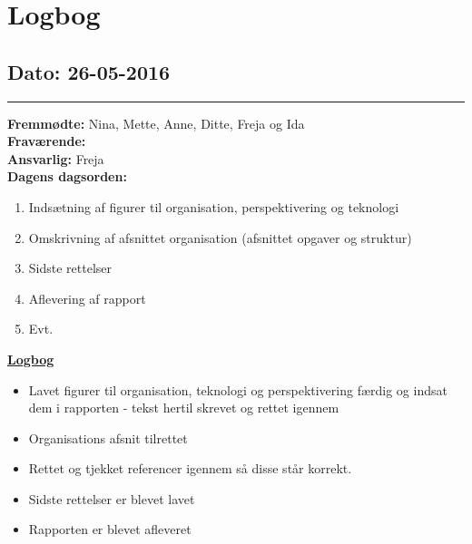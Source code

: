 \chapter{Logbog}
\section{Dato: 26-05-2016}
\hrule
\textbf{Fremmødte:} Nina, Mette, Anne, Ditte, Freja og Ida  \\
\textbf{Fraværende: } \\
\textbf{Ansvarlig:} Freja  \\
\textbf{Dagens dagsorden: }
\begin{enumerate}
\item Indsætning af figurer til organisation, perspektivering og teknologi
\item Omskrivning af afsnittet organisation (afsnittet opgaver og struktur) 
\item Sidste rettelser
\item Aflevering af rapport
\item Evt. 
\end{enumerate}

\underline{\textbf{Logbog}}
\begin{itemize}
\item Lavet figurer til organisation, teknologi og perspektivering færdig og indsat dem i rapporten - tekst hertil skrevet og rettet igennem
\item Organisations afsnit tilrettet
\item Rettet og tjekket referencer igennem så disse står korrekt.
\item Sidste rettelser er blevet lavet
\item Rapporten er blevet afleveret
\end{itemize}
\newpage